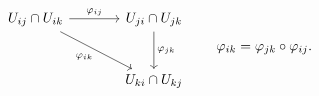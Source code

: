 \[\begin{tikzcd}[column sep=large,row sep=large]
U_{ij}\cap U_{ik} \arrow[r,"\varphi_{ij}"] \arrow[dr,"\varphi_{ik}"'] & U_{ji}\cap U_{jk} \arrow[d,"\varphi_{jk}"]\\
& U_{ki}\cap U_{kj}
\end{tikzcd}\qquad \varphi_{ik}=\varphi_{jk}\circ\varphi_{ij}.\]
